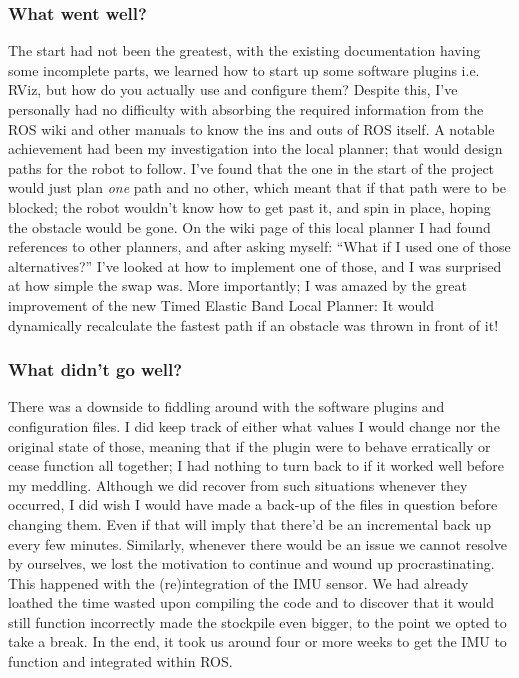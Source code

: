 \subsubsection{What went well?}
The start had not been the greatest, with the existing documentation having some incomplete parts, we learned how to start up some software plugins i.e. RViz, but how do you actually use and configure them?
Despite this, I've personally had no difficulty with absorbing the required information from the ROS wiki and other manuals to know the ins and outs of ROS itself. 
A notable achievement had been my investigation into the local planner; that would design paths for the robot to follow.
I've found that the one in the start of the project would just plan \textit{one} path and no other, which meant that if that path were to be blocked; the robot wouldn't know how to get past it, and spin in place, hoping the obstacle would be gone.
On the wiki page of this local planner I had found references to other planners, and after asking myself: ``What if I used one of those alternatives?'' I've looked at how to implement one of those, and I was surprised at how simple the swap was. 
More importantly; I was amazed by the great improvement of the new Timed Elastic Band Local Planner: It would dynamically recalculate the fastest path if an obstacle was thrown in front of it!

\subsubsection{What didn't go well?}
There was a downside to fiddling around with the software plugins and configuration files.
I did keep track of either what values I would change nor the original state of those, meaning that if the plugin were to behave erratically or cease function all together; I had nothing to turn back to if it worked well before my meddling. 
Although we did recover from such situations whenever they occurred, I did wish I would have made a back-up of the files in question before changing them.
Even if that will imply that there'd be an incremental back up every few minutes.
Similarly, whenever there would be an issue we cannot resolve by ourselves, we lost the motivation to continue and wound up procrastinating. 
This happened with the (re)integration of the IMU sensor. 
We had already loathed the time wasted upon compiling the code and to discover that it would still function incorrectly made the stockpile even bigger, to the point we opted to take a break.
In the end, it took us around four or more weeks to get the IMU to function and integrated within ROS.

